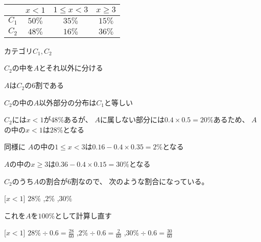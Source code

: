 \documentclass[12pt,b5paper]{ltjsarticle}
\begin{document}
\begin{center}
 \begin{tabular}{|c|c|c|c|}
  & $x < 1$ & $1\leq x < 3$ & $x\geq3$\\
  \hline
  $C_{1}$ & $50\%$ & $35\%$ & $15\%$ \\
  $C_{2}$ & $48\%$ & $16\%$ & $36\%$
 \end{tabular}
\end{center}

カテゴリ$C_{1},C_{2}$

$C_{2}$の中を$A$とそれ以外に分ける

$A$は$C_{2}$の6割である

$C_{2}$の中の$A$以外部分の分布は$C_{1}$と等しい

\begin{center}
\end{center}

$C_{2}$には$x<1$が$48\%$あるが、
$A$に属しない部分には$0.4\times 0.5 = 20\%$あるため、
$A$の中の$x<1$は$28\%$となる

同様に
$A$の中の$1\leq x<3$は$0.16-0.4\times 0.35 = 2\%$となる

$A$の中の$x\geq3$は$0.36-0.4\times 0.15 = 30\%$となる

$C_{2}$のうち$A$の割合が6割なので、
次のような割合になっている。
\begin{center}
 [$x<1$] $28\%$
 ,\qquad
 [$1\leq x<3$] $2\%$
 ,\qquad
 [$x\geq 3$] $30\%$
\end{center}

これを$A$を$100\%$として計算し直す
\begin{center}
 [$x<1$] $28\% \div 0.6 = \frac{28}{60}$
 ,\qquad
 [$1\leq x<3$] $2\% \div 0.6 = \frac{2}{60}$
 ,\qquad
 [$x\geq 3$] $30\% \div 0.6 = \frac{30}{60}$
\end{center}
\end{document}

